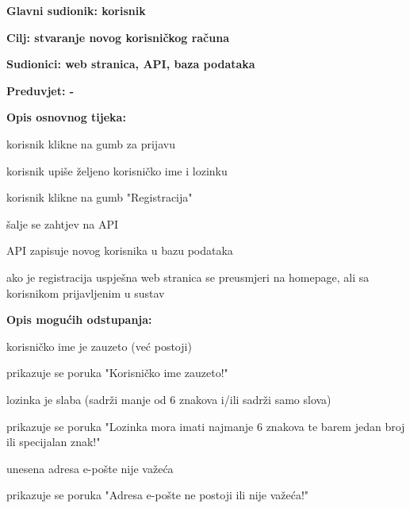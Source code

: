 					\noindent {}
					\begin{packed_item}
						\item \textbf{Glavni sudionik: korisnik}
						\item  \textbf{Cilj: stvaranje novog korisničkog računa}
						\item  \textbf{Sudionici: web stranica, API, baza podataka}
						\item  \textbf{Preduvjet: -}
						
						\item  \textbf{Opis osnovnog tijeka:}
						\item[] \begin{packed_enum}
							\item korisnik klikne na gumb za prijavu
							\item korisnik upiše  željeno korisničko ime i lozinku
							\item korisnik klikne na gumb "Registracija"
							\item šalje se zahtjev na API
							\item API zapisuje novog korisnika u bazu podataka
							\item ako je registracija uspješna web stranica se preusmjeri na homepage, ali sa korisnikom prijavljenim u sustav
						\end{packed_enum}
						
						\item  \textbf{Opis mogućih odstupanja:}
						\item[] \begin{packed_item}							
							\item[1.a] korisničko ime je zauzeto (već postoji)
							\begin{packed_enum}
								\item prikazuje se poruka "Korisničko ime zauzeto!"
							\end{packed_enum}
							\item[1.b] lozinka je slaba (sadrži manje od 6 znakova i/ili sadrži samo slova)
							\begin{packed_enum}
								\item prikazuje se poruka "Lozinka mora imati najmanje 6 znakova te barem jedan broj ili specijalan znak!"
							\end{packed_enum}
							\item[1.c] unesena adresa e-pošte nije važeća
							\begin{packed_enum}
								\item prikazuje se poruka "Adresa e-pošte ne postoji ili nije važeća!"
							\end{packed_enum}
						\end{packed_item}
					\end{packed_item}


